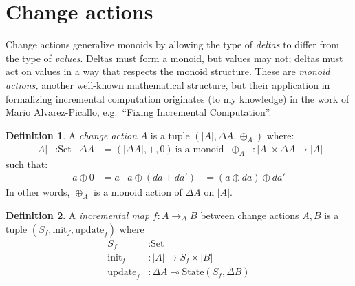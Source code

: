 \documentclass{article}
\theoremstyle{definition}
\newtheorem{definition}{Definition}
\theoremstyle{remark}
\newtheorem{remark}{Remark}
\newcommand\ensuretext[1]{{\ifmmode\text{#1}\else{#1}\fi}}
\newcommand\<\;                 %
\newcommand\lto\multimap
\newcommand\ito{\to_\D}
\newcommand\D\Delta
\newcommand\init{\text{init}}
\newcommand\update{\text{update}}
\newcommand\Set{\text{Set}}
\newcommand\State{\text{State}}
\newcommand\todo[1]{\ensuretext{\color{OrangeRed}#1}}
\begin{document}
\color{black}


\section{Change actions}

Change actions generalize monoids by allowing the type of \emph{deltas} to differ from the type of \emph{values}.
Deltas must form a monoid, but values may not; deltas must act on values in a way that respects the monoid structure.
These are \emph{monoid actions,} another well-known mathematical structure, but their application in formalizing incremental computation originates (to my knowledge) in the work of Mario Alvarez-Picallo, e.g.\ ``Fixing Incremental Computation''.

\begin{definition}
  A \emph{change action} $A$ is a tuple $(|A|, \D A, \oplus_A)$ where:
%
  \begin{align*}
    |A| &: \Set
    &
    \D A &= (|\D A|, +, 0) \ \text{is a monoid}
    &
    \oplus_A &: |A| \times \D A \to |A|
  \end{align*}
%
  such that:
%
  \begin{align*}
    a \oplus 0 &= a
    &
    a \oplus (da + da') &= (a \oplus da) \oplus da'
  \end{align*}
%
  In other words, $\oplus_A$ is a monoid action of $\D A$ on $|A|$.
\end{definition}

\begin{definition}
  A \emph{incremental map} $f : A \ito B$ between change actions $A,B$ is a tuple $(S_f, \init_f, \update_f)$ where
%
  \begin{align*}
    S_f &: \Set
    \\
    \init_f &: |A| \to S_f \times |B|
    \\
    \update_f &: \D A \lto \State({S_f}, \D B)
  \end{align*}
\end{definition}

\end{document}
